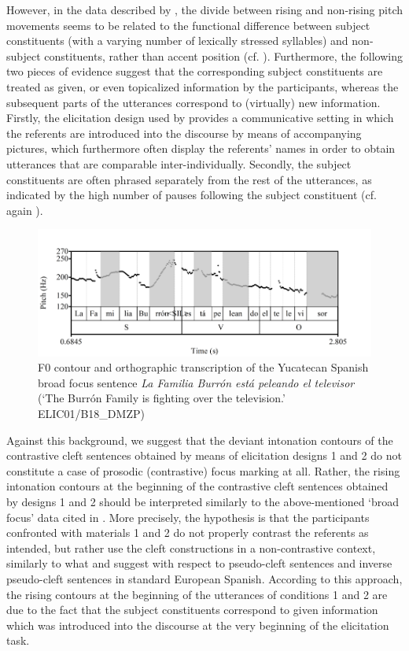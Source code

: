 \documentclass[output=paper]{langsci/langscibook}
\begin{document}
However, in the data described by \citet{Uth16}, the divide between rising and non-rising pitch movements seems to be related to the functional difference between subject constituents (with a varying number of lexically stressed syllables) and non-subject constituents, rather than accent position (cf. ). Furthermore, the following two pieces of evidence suggest that the corresponding subject constituents are treated as given, or even topicalized information by the participants, whereas the subsequent parts of the utterances correspond to (virtually) new information. Firstly, the elicitation design used by \citet{Uth16} provides a communicative setting in which the referents are introduced into the discourse by means of accompanying pictures, which furthermore often display the referents' names in order to obtain utterances that are comparable inter-individually. Secondly, the subject constituents are often phrased separately from the rest of the utterances, as indicated by the high number of pauses following the subject constituent (cf. again ).
 
\begin{figure}
\includegraphics[width=\textwidth]{figures/UTH-img40.png}
\caption{F0 contour and orthographic transcription of the Yucatecan Spanish broad focus sentence 
\textit{La Familia Burrón está peleando el televisor} 
(‘The Burrón Family is fighting over the television.’ ELIC01/B18\_DMZP)}
\label{fig:uth:17}
\end{figure}

Against this background, we suggest that the deviant intonation contours of the contrastive cleft sentences obtained by means of elicitation designs 1 and 2 do not constitute a case of prosodic (contrastive) focus marking at all. Rather, the rising intonation contours at the beginning of the contrastive cleft sentences obtained by designs 1 and 2 should be interpreted similarly to the above-mentioned ‘broad focus' data cited in \citet{Uth16}. More precisely, the hypothesis is that the participants confronted with materials 1 and 2 do not properly contrast the referents as intended, but rather use the cleft constructions in a non-contrastive context, similarly to what \citet[4299]{MorenoCabrera99} and \citet{FeldhausenVanrell2015} suggest with respect to pseudo-cleft sentences and inverse pseudo-cleft sentences in standard European Spanish. According to this approach, the rising contours at the beginning of the utterances of conditions 1 and 2 are due to the fact that the subject constituents correspond to given information which was introduced into the discourse at the very beginning of the elicitation task.
\end{document}
